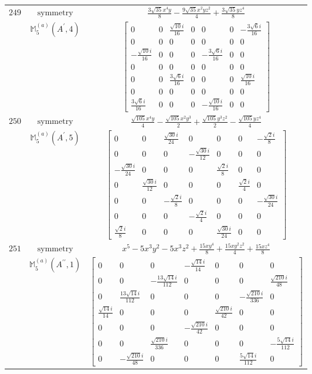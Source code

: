 \documentclass[fleqn,8pt,landscape]{jsarticle}
\begin{document}
\begin{longtable}{ccc}
$ 249 $ & $ \text{symmetry} $ & $ \frac{3 \sqrt{35} x^{4} y}{8} - \frac{9 \sqrt{35} x^{2} y z^{2}}{4} + \frac{3 \sqrt{35} y z^{4}}{8} $ \\
$  $ & $ \mathbb{M}_{5}^{(a)}(A^{\prime},4) $ & $ \begin{bmatrix} 0 & 0 & \frac{\sqrt{10} i}{16} & 0 & 0 & 0 & - \frac{3 \sqrt{6} i}{16} \\ 0 & 0 & 0 & 0 & 0 & 0 & 0 \\ - \frac{\sqrt{10} i}{16} & 0 & 0 & 0 & - \frac{3 \sqrt{6} i}{16} & 0 & 0 \\ 0 & 0 & 0 & 0 & 0 & 0 & 0 \\ 0 & 0 & \frac{3 \sqrt{6} i}{16} & 0 & 0 & 0 & \frac{\sqrt{10} i}{16} \\ 0 & 0 & 0 & 0 & 0 & 0 & 0 \\ \frac{3 \sqrt{6} i}{16} & 0 & 0 & 0 & - \frac{\sqrt{10} i}{16} & 0 & 0 \end{bmatrix} $ \\ \hline
$ 250 $ & $ \text{symmetry} $ & $ \frac{\sqrt{105} x^{4} y}{4} - \frac{\sqrt{105} x^{2} y^{3}}{2} + \frac{\sqrt{105} y^{3} z^{2}}{2} - \frac{\sqrt{105} y z^{4}}{4} $ \\
$  $ & $ \mathbb{M}_{5}^{(a)}(A^{\prime},5) $ & $ \begin{bmatrix} 0 & 0 & \frac{\sqrt{30} i}{24} & 0 & 0 & 0 & - \frac{\sqrt{2} i}{8} \\ 0 & 0 & 0 & - \frac{\sqrt{30} i}{12} & 0 & 0 & 0 \\ - \frac{\sqrt{30} i}{24} & 0 & 0 & 0 & \frac{\sqrt{2} i}{8} & 0 & 0 \\ 0 & \frac{\sqrt{30} i}{12} & 0 & 0 & 0 & \frac{\sqrt{2} i}{4} & 0 \\ 0 & 0 & - \frac{\sqrt{2} i}{8} & 0 & 0 & 0 & - \frac{\sqrt{30} i}{24} \\ 0 & 0 & 0 & - \frac{\sqrt{2} i}{4} & 0 & 0 & 0 \\ \frac{\sqrt{2} i}{8} & 0 & 0 & 0 & \frac{\sqrt{30} i}{24} & 0 & 0 \end{bmatrix} $ \\ \hline
$ 251 $ & $ \text{symmetry} $ & $ x^{5} - 5 x^{3} y^{2} - 5 x^{3} z^{2} + \frac{15 x y^{4}}{8} + \frac{15 x y^{2} z^{2}}{4} + \frac{15 x z^{4}}{8} $ \\
$  $ & $ \mathbb{M}_{5}^{(a)}(A^{\prime\prime},1) $ & $ \begin{bmatrix} 0 & 0 & 0 & - \frac{\sqrt{14} i}{14} & 0 & 0 & 0 \\ 0 & 0 & - \frac{13 \sqrt{14} i}{112} & 0 & 0 & 0 & \frac{\sqrt{210} i}{48} \\ 0 & \frac{13 \sqrt{14} i}{112} & 0 & 0 & 0 & - \frac{\sqrt{210} i}{336} & 0 \\ \frac{\sqrt{14} i}{14} & 0 & 0 & 0 & \frac{\sqrt{210} i}{42} & 0 & 0 \\ 0 & 0 & 0 & - \frac{\sqrt{210} i}{42} & 0 & 0 & 0 \\ 0 & 0 & \frac{\sqrt{210} i}{336} & 0 & 0 & 0 & - \frac{5 \sqrt{14} i}{112} \\ 0 & - \frac{\sqrt{210} i}{48} & 0 & 0 & 0 & \frac{5 \sqrt{14} i}{112} & 0 \end{bmatrix} $ \\ \hline

\end{longtable}
\end{document}
